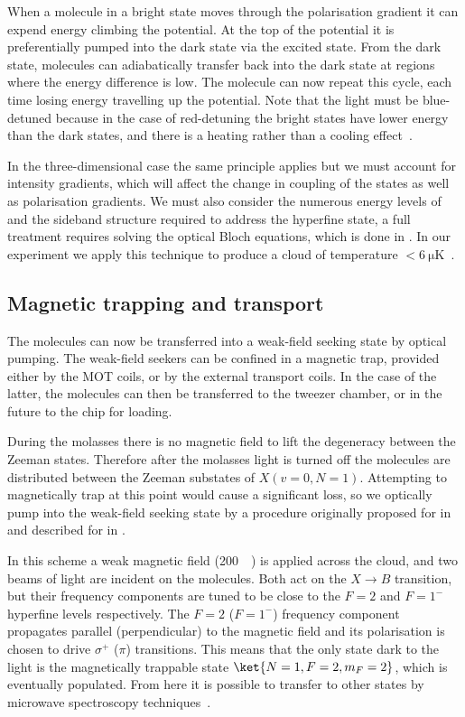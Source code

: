 When a molecule in a bright state moves through the polarisation gradient it
can expend energy climbing the potential. At the top of the potential it is
preferentially pumped into the dark state via the excited state. From the dark
state, molecules can adiabatically transfer back into the dark state at regions
where the energy difference is low. The molecule can now repeat this cycle,
each time losing energy travelling up the potential. Note that the light must
be blue-detuned because in the case of red-detuning the bright states have
lower energy than the dark states, and there is a heating rather than a cooling
effect~\cite{1367-2630-18-12-123017}.

In the three-dimensional case the same principle applies but we must account
for intensity gradients, which will affect the change in coupling of the states
as well as polarisation gradients. We must also consider the numerous energy
levels of \CaF{} and the sideband structure required to address the hyperfine
state, a full treatment requires solving the optical Bloch equations, which is
done in .  In our experiment we apply this
technique to produce a \CaF{} cloud of temperature
$<\SI{6}{\micro\kelvin}$~\cite{PhysRevLett.123.033202}.

\subsection*{Magnetic trapping and transport}

The molecules can now be transferred into a weak-field seeking state by optical
pumping. The weak-field seekers can be confined in a magnetic trap, provided
either by the MOT coils, or by the external transport coils. In the case of the
latter, the molecules can then be transferred to the tweezer chamber, or in the
future to the chip for loading.

During the molasses there is no magnetic field to lift the degeneracy between
the Zeeman states. Therefore after the molasses light is turned off the
molecules are distributed between the Zeeman substates of $X(v=0, N=1)$.
Attempting to magnetically trap at this point would cause a significant loss,
so we optically pump into the weak-field seeking state by a procedure originally
proposed for \SrF{} in \inlineref{} %
and described for \CaF{} in .

In this scheme a weak magnetic field (\SI{200}{\milli\gauss}) is applied across
the cloud, and two beams of light are incident on the molecules. Both act on
the $X\rightarrow B$ transition, but their frequency components are tuned to be
close to the $F=2$ and $F=1^-$ hyperfine levels respectively. The $F=2$ ($F=1^-$)
frequency component propagates parallel (perpendicular) to the magnetic field
and its polarisation is chosen to drive $\sigma^+$ ($\pi$) transitions. This
means that the only state dark to the light is the magnetically trappable state
$\ket{N=1, F=2, m_F=2}$, which is eventually populated. From here it is
possible to transfer to other states by microwave spectroscopy
techniques~\cite{WilliamsMagnetic2018}.

